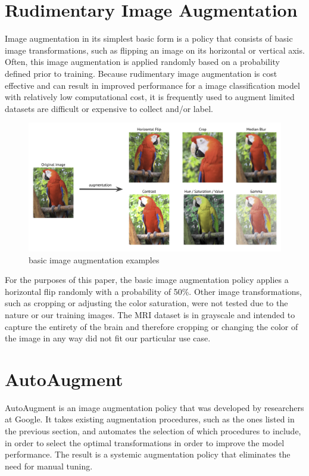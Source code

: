 \documentclass [MS] {uclathes}
\begin{document}
\section{Rudimentary Image Augmentation}
Image augmentation in its simplest basic form is a policy that consists of basic image transformations, such as flipping
an image on its horizontal or vertical axis. Often, this image augmentation is applied randomly based on a probability 
defined prior to training. Because rudimentary image augmentation is cost effective and can result in improved 
performance for a image classification model with relatively low computational cost, it is frequently used to augment 
limited datasets are difficult or expensive to collect and/or label.

\begin{figure} [H]
    \centering
    \includegraphics[width=0.75\linewidth]{figures/basic-image-augmentation-example.png}
    \caption{basic image augmentation examples}
    \label{fig:basic image augmentation examples}
\end{figure}

For the purposes of this paper, the basic image augmentation policy applies a horizontal flip randomly with a 
probability of 50\%. Other image transformations, such as cropping or adjusting the color saturation, were not tested 
due to the nature or our training images. The MRI dataset is in grayscale and intended to capture the entirety of the 
brain and therefore cropping or changing the color of the image in any way did not fit our particular use case. 

\section{AutoAugment}
AutoAugment is an image augmentation policy that was developed by researchers at Google. It takes existing augmentation 
procedures, such as the ones listed in the previous section, and automates the selection of which procedures to include,
in order to select the optimal transformations in order to improve the model performance. The result is a systemic 
augmentation policy that eliminates the need for manual tuning. 
\end{document}
